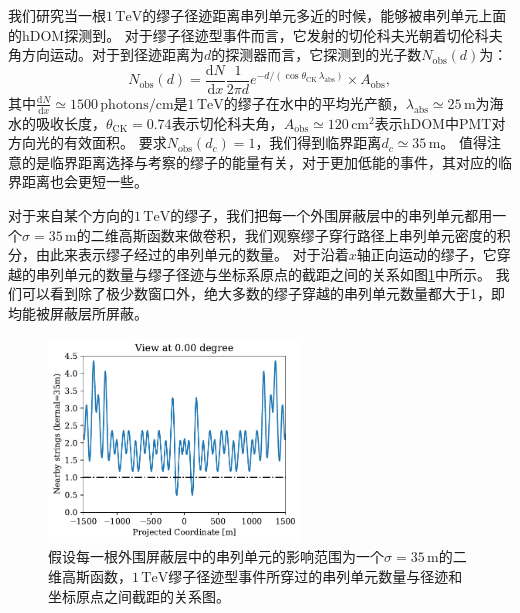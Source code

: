 我们研究当一根$1\,\mathrm{TeV}$的缪子径迹距离串列单元多近的时候，能够被串列单元上面的hDOM探测到。
对于缪子径迹型事件而言，它发射的切伦科夫光朝着切伦科夫角方向运动。对于到径迹距离为$d$的探测器而言，它探测到的光子数$N_\mathrm{obs} (d)$为：
\begin{equation}
    N_\mathrm{obs} (d) = 
    \frac{\mathrm{d}N}{\mathrm{d}x}
    \frac{1}{2 \pi d} e^{-d/(\cos\theta_\mathrm{CK} \,\lambda_\mathrm{abs})} 
    \times A_\mathrm{obs} ,
\end{equation}
其中$\frac{\mathrm{d}N}{\mathrm{d}x} \simeq 1500 \,\mathrm{photons/cm}$是$1\,\mathrm{TeV}$的缪子在水中的平均光产额，$\lambda_\mathrm{abs} \simeq 25\,\mathrm{m}$为海水的吸收长度，$\theta_\mathrm{CK} = 0.74$表示切伦科夫角，$A_\mathrm{obs} \simeq 120\,\mathrm{cm^2}$表示hDOM中PMT对方向光的有效面积。
要求$N_\mathrm{obs} (d_c) = 1$，我们得到临界距离$d_c \simeq 35\,\mathrm{m}$。
值得注意的是临界距离选择与考察的缪子的能量有关，对于更加低能的事件，其对应的临界距离也会更短一些。

对于来自某个方向的$1\,\mathrm{TeV}$的缪子，我们把每一个外围屏蔽层中的串列单元都用一个$\sigma = 35\,\mathrm{m}$的二维高斯函数来做卷积，我们观察缪子穿行路径上串列单元密度的积分，由此来表示缪子经过的串列单元的数量。
对于沿着$x$轴正向运动的缪子，它穿越的串列单元的数量与缪子径迹与坐标系原点的截距之间的关系如图\ref{fig:corridor_penrose}中所示。
我们可以看到除了极少数窗口外，绝大多数的缪子穿越的串列单元数量都大于1，即均能被屏蔽层所屏蔽。

\begin{figure}[!htb]%
    \centering
    \includegraphics[width=0.60\textwidth]{img/corridor_penrose.pdf}
    \caption{假设每一根外围屏蔽层中的串列单元的影响范围为一个$\sigma = 35\,\mathrm{m}$的二维高斯函数，$1\,\mathrm{TeV}$缪子径迹型事件所穿过的串列单元数量与径迹和坐标原点之间截距的关系图。}
    \label{fig:corridor_penrose}
\end{figure}

